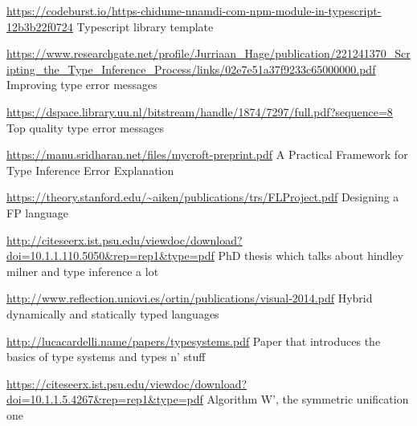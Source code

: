 \documentclass[a4paper,fleqn,12pt]{article}
\begin{document}
\underline{\href{https://codeburst.io/https-chidume-nnamdi-com-npm-module-in-typescript-12b3b22f0724}{https://codeburst.io/https-chidume-nnamdi-com-npm-module-in-typescript-12b3b22f0724}}
Typescript library template

\underline{\href{https://www.researchgate.net/profile/Jurriaan\_Hage/publication/221241370\_Scripting\_the\_Type\_Inference\_Process/links/02e7e51a37f9233c65000000.pdf}{https://www.researchgate.net/profile/Jurriaan\_Hage/publication/221241370\_Scripting\_the\_Type\_Inference\_Process/links/02e7e51a37f9233c65000000.pdf}}
Improving type error messages

\underline{\href{https://dspace.library.uu.nl/bitstream/handle/1874/7297/full.pdf?sequence=8}{https://dspace.library.uu.nl/bitstream/handle/1874/7297/full.pdf?sequence=8}}
Top quality type error messages

\underline{\href{https://manu.sridharan.net/files/mycroft-preprint.pdf}{https://manu.sridharan.net/files/mycroft-preprint.pdf}}
A Practical Framework for Type Inference Error Explanation

\underline{\href{https://theory.stanford.edu/\textasciitilde aiken/publications/trs/FLProject.pdf}{https://theory.stanford.edu/\textasciitilde aiken/publications/trs/FLProject.pdf}}
Designing a FP language

\underline{\href{http://citeseerx.ist.psu.edu/viewdoc/download?doi=10.1.1.110.5050\&rep=rep1\&type=pdf}{http://citeseerx.ist.psu.edu/viewdoc/download?doi=10.1.1.110.5050\&rep=rep1\&type=pdf}}
PhD thesis which talks about hindley milner and type inference a lot

\underline{\href{http://www.reflection.uniovi.es/ortin/publications/visual-2014.pdf}{http://www.reflection.uniovi.es/ortin/publications/visual-2014.pdf}}
Hybrid dynamically and statically typed languages

\underline{\href{http://lucacardelli.name/papers/typesystems.pdf}{http://lucacardelli.name/papers/typesystems.pdf}}
Paper that introduces the basics of type systems and types n’ stuff

\underline{\href{https://citeseerx.ist.psu.edu/viewdoc/download?doi=10.1.1.5.4267\&rep=rep1\&type=pdf}{https://citeseerx.ist.psu.edu/viewdoc/download?doi=10.1.1.5.4267\&rep=rep1\&type=pdf}}
Algorithm W’, the symmetric unification one
\end{document}

